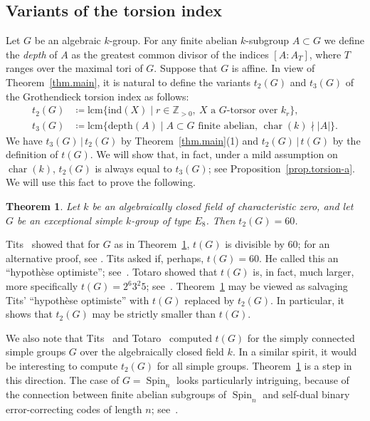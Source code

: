 \documentclass[12pt]{amsart}
\numberwithin{equation}{section}
\newtheorem{theorem}{Theorem}[section]
\theoremstyle{remark}
\newcommand{\Spin}{\operatorname{Spin}}
\newcommand{\Char}{\operatorname{char}}
\begin{document}
\subsection{Variants of the torsion index}
Let $G$ be an algebraic $k$-group. For any finite abelian $k$-subgroup $A\subset G$ we define the \emph{depth} of $A$ as the greatest common divisor of the indices $[A:A_T]$, where $T$ ranges over the maximal tori of $G$.
Suppose that $G$ is affine. In view of Theorem~\ref{thm.main}, it is natural to define the variants $t_2(G)$ and $t_3(G)$ of the Grothendieck torsion index as follows:
\begin{align}
t_2(G) &\coloneqq \mathrm{lcm}\{\mathrm{ind}(X)\mid r\in \mathbb{Z}_{>0},\ 
X \text{ a } G\text{-torsor over } k_r\}, \label{eq:t2}\\
t_3(G) &\coloneqq \mathrm{lcm}\{\mathrm{depth}(A)\mid
A\subset G \text{ finite abelian, $\Char(k)\nmid |A|$}\}. \label{eq:t3}
\end{align}
We have $t_3(G) \, | \, t_2(G)$ by Theorem~\ref{thm.main}(1) and
$t_2(G) \, | \, t(G)$ by the definition of $t(G)$.
We will show that, in fact, under a mild assumption on $\Char(k)$, $t_2(G)$ is always equal to $t_3(G)$; see Proposition~\ref{prop.torsion-a}. We will use this fact to prove the following.

\begin{theorem} \label{thm.torsion-b} Let $k$ be an algebraically closed field of characteristic zero, and let $G$ be an exceptional simple $k$-group of type $E_8$. Then $t_2(G) =  60$.
\end{theorem}

 Tits~\cite[Proposition 9]{tits1992} showed that for $G$ as in Theorem~\ref{thm.torsion-b}, $t(G)$ is divisible by $60$; for an alternative proof, see \cite[Corollary 5.5]{reichstein-youssin2}.
  Tits asked if, perhaps, $t(G) = 60$. He called this an ``hypoth\`ese optimiste''; see~\cite[Section 5.2]{tits92}. Totaro showed that $t(G)$ is, in fact, much larger, more specifically $t(G) = 2^6 3^2 5$; see~\cite{totaro-E8}. Theorem~\ref{thm.torsion-b} may be viewed as salvaging Tits' ``hypoth\`ese optimiste'' with $t(G)$ replaced by $t_2(G)$. In particular, it shows that $t_2(G)$ may be strictly smaller than $t(G)$.

We also note that Tits~\cite{tits92} and Totaro~\cite{totaro-E8, totaro-spin} computed
$t(G)$ for the simply connected simple groups $G$ over the algebraically closed field $k$. In a similar spirit, it would be interesting to compute $t_2(G)$ for all simple groups. Theorem~\ref{thm.torsion-b} is a step in this direction.
The case of $G = \Spin_n$ looks particularly intriguing, because of the connection between finite abelian subgroups of $\Spin_n$ and self-dual binary error-correcting codes of length $n$; see~\cite{wood}.
\end{document}
